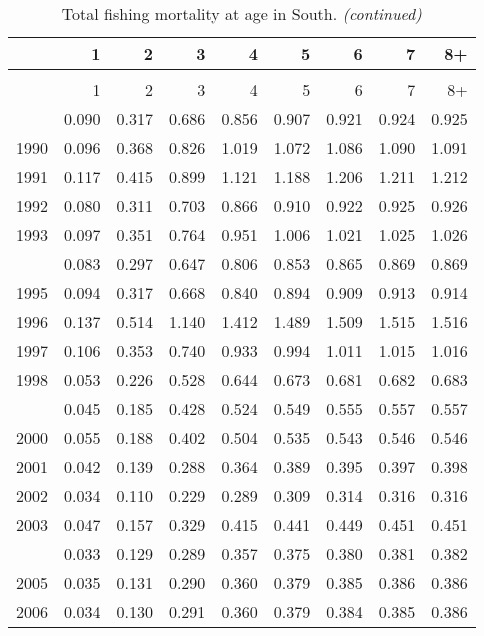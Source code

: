 \documentclass[
]{article}
\begin{document}
\begin{longtable}[t]{lrrrrrrrr}
\caption{\label{tab:South-region-FAA-table}Total fishing mortality at age in South.}\\
\toprule
  & 1 & 2 & 3 & 4 & 5 & 6 & 7 & 8+\\
\midrule
\endfirsthead
\caption[]{Total fishing mortality at age in South. \textit{(continued)}}\\
\toprule
  & 1 & 2 & 3 & 4 & 5 & 6 & 7 & 8+\\
\midrule
\endhead

\endfoot
\bottomrule
\endlastfoot
1989 & 0.090 & 0.317 & 0.686 & 0.856 & 0.907 & 0.921 & 0.924 & 0.925\\
1990 & 0.096 & 0.368 & 0.826 & 1.019 & 1.072 & 1.086 & 1.090 & 1.091\\
1991 & 0.117 & 0.415 & 0.899 & 1.121 & 1.188 & 1.206 & 1.211 & 1.212\\
1992 & 0.080 & 0.311 & 0.703 & 0.866 & 0.910 & 0.922 & 0.925 & 0.926\\
1993 & 0.097 & 0.351 & 0.764 & 0.951 & 1.006 & 1.021 & 1.025 & 1.026\\
\addlinespace
1994 & 0.083 & 0.297 & 0.647 & 0.806 & 0.853 & 0.865 & 0.869 & 0.869\\
1995 & 0.094 & 0.317 & 0.668 & 0.840 & 0.894 & 0.909 & 0.913 & 0.914\\
1996 & 0.137 & 0.514 & 1.140 & 1.412 & 1.489 & 1.509 & 1.515 & 1.516\\
1997 & 0.106 & 0.353 & 0.740 & 0.933 & 0.994 & 1.011 & 1.015 & 1.016\\
1998 & 0.053 & 0.226 & 0.528 & 0.644 & 0.673 & 0.681 & 0.682 & 0.683\\
\addlinespace
1999 & 0.045 & 0.185 & 0.428 & 0.524 & 0.549 & 0.555 & 0.557 & 0.557\\
2000 & 0.055 & 0.188 & 0.402 & 0.504 & 0.535 & 0.543 & 0.546 & 0.546\\
2001 & 0.042 & 0.139 & 0.288 & 0.364 & 0.389 & 0.395 & 0.397 & 0.398\\
2002 & 0.034 & 0.110 & 0.229 & 0.289 & 0.309 & 0.314 & 0.316 & 0.316\\
2003 & 0.047 & 0.157 & 0.329 & 0.415 & 0.441 & 0.449 & 0.451 & 0.451\\
\addlinespace
2004 & 0.033 & 0.129 & 0.289 & 0.357 & 0.375 & 0.380 & 0.381 & 0.382\\
2005 & 0.035 & 0.131 & 0.290 & 0.360 & 0.379 & 0.385 & 0.386 & 0.386\\
2006 & 0.034 & 0.130 & 0.291 & 0.360 & 0.379 & 0.384 & 0.385 & 0.386\\

\end{longtable}
\end{document}
